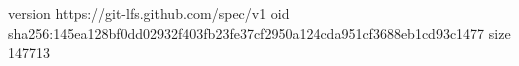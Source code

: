 version https://git-lfs.github.com/spec/v1
oid sha256:145ea128bf0dd02932f403fb23fe37cf2950a124cda951cf3688eb1cd93c1477
size 147713
